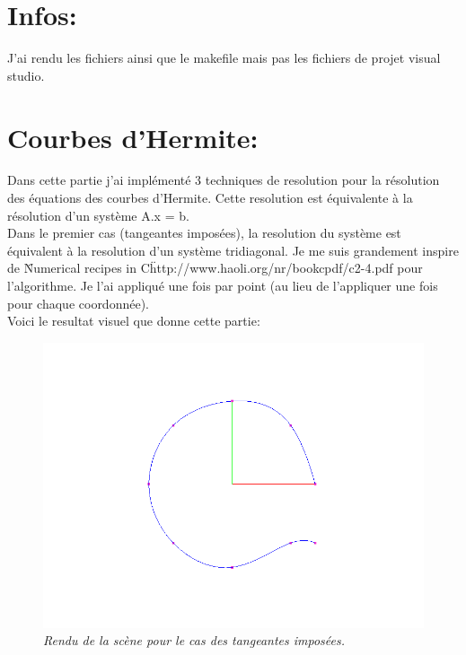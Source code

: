 \documentclass[12pt,letterpaper]{article}
\begin{document}
    
     
	\newpage
	
    \section{Infos:}
	J'ai rendu les fichiers ainsi que le makefile mais pas les fichiers de projet visual studio.

    \section{Courbes d'Hermite:}
	\setlength{\parindent}{1cm}

	Dans cette partie j'ai implémenté 3 techniques de resolution pour la résolution des équations des courbes d'Hermite. Cette resolution est équivalente à la résolution d'un système A.x = b.\\
	Dans le premier cas (tangeantes imposées), la resolution du système est équivalent à la resolution d'un système tridiagonal. Je me suis grandement inspire de \"Numerical recipes in C\" http://www.haoli.org/nr/bookcpdf/c2-4.pdf pour l'algorithme. Je l'ai appliqué une fois par point (au lieu de l'appliquer une fois pour chaque coordonnée).\\
	Voici le resultat visuel que donne cette partie:
\begin{figure}[h!]
	\centering
	\includegraphics[scale=0.3]{images/imposedtang.png}
	\caption{\textit{Rendu de la scène pour le cas des tangeantes imposées.}}
\end{figure}
	
\end{document}
